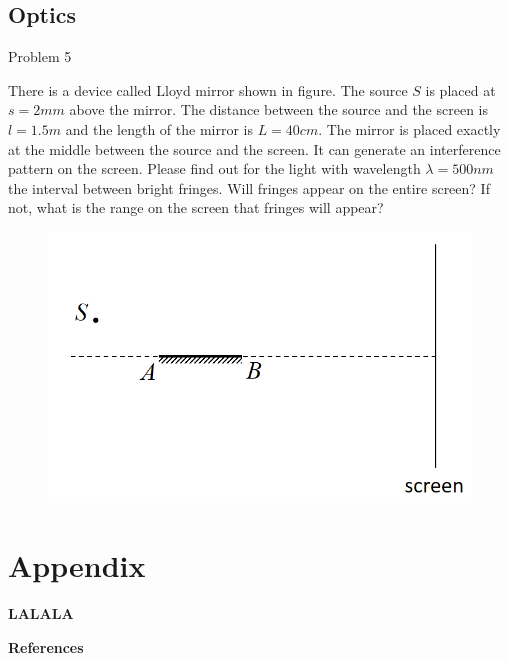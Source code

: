 \documentclass{beamer}
\begin{document}
\subsection{Optics}

\begin{frame}{Problem 5}

    \small
    There is a device called Lloyd mirror shown in figure. The source $S$ is placed at $s=2mm$ above the mirror. The distance between the source and the screen is $l=1.5m$ and the length of the mirror is $L=40cm$. The mirror is placed exactly at the middle between the source and the screen. It can generate an interference pattern on the screen. Please find out for the light with wavelength $\lambda=500nm$ the interval between bright fringes. Will fringes appear on the entire screen? If not, what is the range on the screen that fringes will appear?

\begin{figure}[htbp]
    \centering
    \includegraphics[scale=0.6]{images/005.png}
\end{figure}

\end{frame}

\section*{Appendix}

\begin{frame}
    \begin{center}
        \LARGE\bf LALALA
    \end{center}

\end{frame}


\begin{frame}{\bf References}
    \nocite{*} %
    
    
\end{frame}
\end{document}
